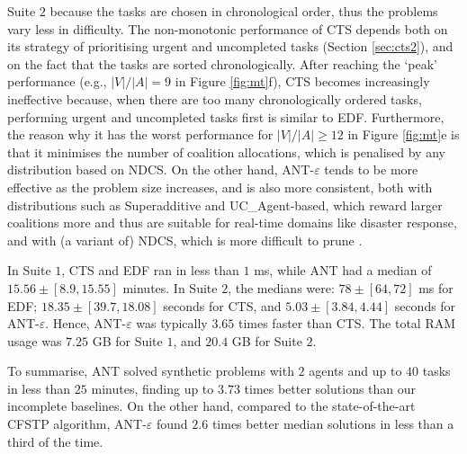 Suite $2$ because the tasks are chosen in chronological order, thus the problems vary less
in difficulty. The non-monotonic performance of CTS depends both on its strategy of
prioritising urgent and uncompleted tasks (Section \ref{sec:cts2}), and on the fact that
the tasks are sorted chronologically. After reaching the `peak' performance (e.g.,
$|V|/|A| = 9$ in Figure \ref{fig:mt}f), CTS becomes increasingly ineffective because, when
there are too many chronologically ordered tasks, performing urgent and uncompleted tasks
first is similar to EDF. Furthermore, the reason why it has the worst performance for
$|V|/|A| \geq 12$ in Figure \ref{fig:mt}e is that it minimises the number of coalition
allocations, which is penalised by any distribution based on NDCS. On the other hand,
ANT-$\varepsilon$ tends to be more effective as the problem size increases, and is also
more consistent, both with distributions such as Superadditive and UC\_Agent-based, which
reward larger coalitions more and thus are suitable for real-time domains like disaster
response, and with (a variant of) NDCS, which is more difficult to prune \cite[Section
$5.2$]{rahwan2009}.

In Suite $1$, CTS and EDF ran in less than $1$ ms, while ANT had a median of $15.56 \pm
[8.9, 15.55]$ minutes. In Suite $2$, the medians were: $78 \pm [64, 72]$ ms for EDF;
$18.35 \pm [39.7, 18.08]$ seconds for CTS, and $5.03 \pm [3.84, 4.44]$ seconds for
ANT-$\varepsilon$. Hence, ANT-$\varepsilon$ was typically $3.65$ times faster than CTS.
The total RAM usage was $7.25$ GB for Suite $1$, and $20.4$ GB for Suite $2$.

To summarise, ANT solved synthetic problems with $2$ agents and up to $40$ tasks in less
than $25$ minutes, finding up to $3.73$ times better solutions than our incomplete
baselines. On the other hand, compared to the state-of-the-art CFSTP algorithm,
ANT-$\varepsilon$ found $2.6$ times better median solutions in less than a third of the
time.
